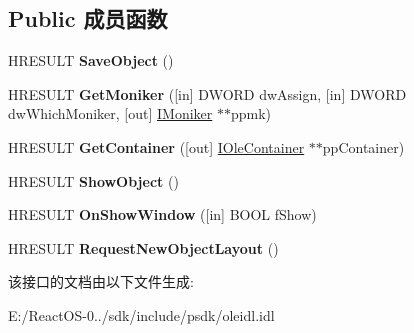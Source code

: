 \subsection*{Public 成员函数}
\begin{DoxyCompactItemize}
\item 
\mbox{\label{interface_i_ole_client_site_a4969eacf623ef683a60b1c527af80118}} 
H\+R\+E\+S\+U\+LT {\bfseries Save\+Object} ()
\item 
\mbox{\label{interface_i_ole_client_site_a52be179ed66b8fc8e4376a1b839ff693}} 
H\+R\+E\+S\+U\+LT {\bfseries Get\+Moniker} (\mbox{[}in\mbox{]} D\+W\+O\+RD dw\+Assign, \mbox{[}in\mbox{]} D\+W\+O\+RD dw\+Which\+Moniker, \mbox{[}out\mbox{]} \hyperlink{interface_i_moniker}{I\+Moniker} $\ast$$\ast$ppmk)
\item 
\mbox{\label{interface_i_ole_client_site_a4bc680b9b5f4a231c248f5f520e81d90}} 
H\+R\+E\+S\+U\+LT {\bfseries Get\+Container} (\mbox{[}out\mbox{]} \hyperlink{interface_i_ole_container}{I\+Ole\+Container} $\ast$$\ast$pp\+Container)
\item 
\mbox{\label{interface_i_ole_client_site_a750ddceb068099f9c3c9bd82cfc3f7ed}} 
H\+R\+E\+S\+U\+LT {\bfseries Show\+Object} ()
\item 
\mbox{\label{interface_i_ole_client_site_a15d50fa72857e8958a3e44bfd215fc9b}} 
H\+R\+E\+S\+U\+LT {\bfseries On\+Show\+Window} (\mbox{[}in\mbox{]} B\+O\+OL f\+Show)
\item 
\mbox{\label{interface_i_ole_client_site_ad112b516018f964fb6d9f9ff752ae810}} 
H\+R\+E\+S\+U\+LT {\bfseries Request\+New\+Object\+Layout} ()
\end{DoxyCompactItemize}


该接口的文档由以下文件生成\+:\begin{DoxyCompactItemize}
\item 
E\+:/\+React\+O\+S-\/0../sdk/include/psdk/oleidl.\+idl\end{DoxyCompactItemize}

